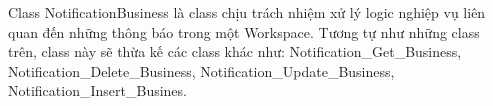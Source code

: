\par
Class NotificationBusiness là class chịu trách nhiệm xử lý logic nghiệp vụ liên quan đến
những thông báo trong một Workspace. Tương tự như những class trên, class này sẽ thừa kế các class khác như:
Notification\_Get\_Business, Notification\_Delete\_Business, Notification\_Update\_Business, Notification\_Insert\_Busines.
